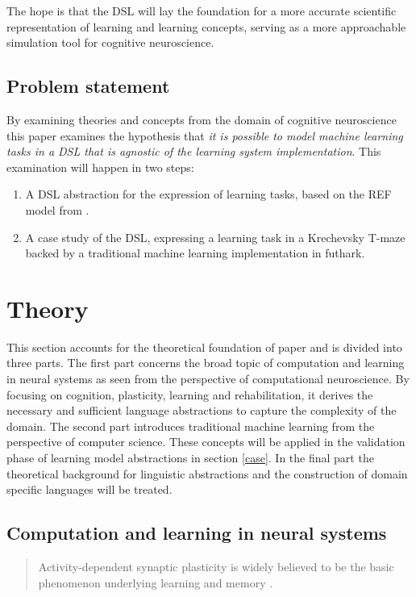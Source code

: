 \documentclass[a4paper,oneside]{memoir}
\begin{document}
The hope is that the DSL will lay the foundation for a more accurate scientific
representation of learning and learning concepts, serving as a more approachable
simulation tool for cognitive neuroscience.


\subsection{Problem statement}
By examining theories and concepts from the domain of cognitive neuroscience
this paper examines the hypothesis that \textit{it is possible to model
machine learning tasks in a DSL that is agnostic of the learning system
implementation}. This examination will happen in two steps:

\begin{enumerate}
  \item A DSL abstraction for the expression of learning tasks,
        based on the REF model from \autocite{Mogensen2011}.
  \item A case study of the DSL, expressing a learning task in a Krechevsky
        T-maze \autocite{Krechevsky1932} backed by a traditional machine
        learning implementation in \gls{futhark}.
\end{enumerate}

\section{Theory}
This section accounts for the theoretical foundation of paper and is divided
into three parts.
The first part concerns the broad topic of computation and learning in neural
systems as seen from the perspective of computational neuroscience. By focusing
on cognition, plasticity, learning and rehabilitation, it derives
the necessary and sufficient language abstractions to capture the complexity
of the domain.
The second part introduces traditional machine learning from the perspective of
computer science. These concepts will be applied in the validation phase of
learning model abstractions in section \ref{case}.
In the final part the theoretical background for linguistic abstractions and
the construction of domain specific languages will be treated.

\subsection{Computation and learning in neural systems}
\begin{quote}
  Activity-dependent synaptic plasticity is widely believed to be the basic
  phenomenon underlying learning and memory \autocite{dayan2001}.
\end{quote}
\end{document}
